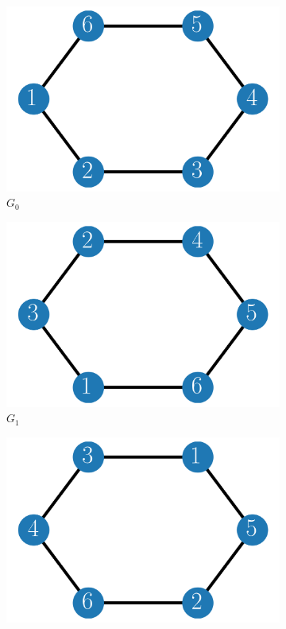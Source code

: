 \begin{figure}[h]
	\centering
    \begin{subfigure}[b]{0.3\textwidth}
		\centering
		\includegraphics[width=\textwidth]{./figures/shuffled_ring_1.png}
		\caption*{$G_0$}
	\end{subfigure}
	\begin{subfigure}[b]{0.3\textwidth}
		\centering
		\includegraphics[width=\textwidth]{./figures/shuffled_ring_2.png}
		\caption*{$G_1$}
	\end{subfigure}
	\begin{subfigure}[b]{0.3\textwidth}
		\centering
		\includegraphics[width=\textwidth]{./figures/shuffled_ring_3.png}

\end{subfigure}
\end{figure}
